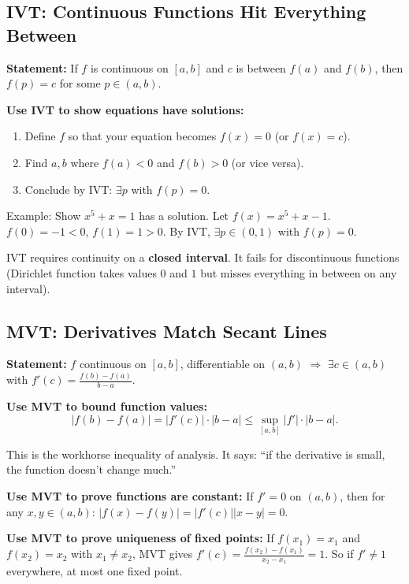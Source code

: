 \documentclass[11pt]{article}
\theoremstyle{definition}
\begin{document}
\subsection{IVT: Continuous Functions Hit Everything Between}

\textbf{Statement:} If $f$ is continuous on $[a,b]$ and $c$ is between $f(a)$ and $f(b)$, then $f(p) = c$ for some $p \in (a,b)$.

\begin{application}
\textbf{Use IVT to show equations have solutions:}
\begin{enumerate}
\item Define $f$ so that your equation becomes $f(x) = 0$ (or $f(x) = c$).
\item Find $a, b$ where $f(a) < 0$ and $f(b) > 0$ (or vice versa).
\item Conclude by IVT: $\exists p$ with $f(p) = 0$.
\end{enumerate}

Example: Show $x^5 + x = 1$ has a solution. Let $f(x) = x^5 + x - 1$. $f(0) = -1 < 0$, $f(1) = 1 > 0$. By IVT, $\exists p \in (0,1)$ with $f(p) = 0$.
\end{application}

\begin{pitfall}
IVT requires continuity on a \textbf{closed interval}. It fails for discontinuous functions (Dirichlet function takes values $0$ and $1$ but misses everything in between on any interval).
\end{pitfall}

\subsection{MVT: Derivatives Match Secant Lines}

\textbf{Statement:} $f$ continuous on $[a,b]$, differentiable on $(a,b)$ $\Rightarrow$ $\exists c \in (a,b)$ with $f'(c) = \frac{f(b) - f(a)}{b - a}$.

\begin{application}
\textbf{Use MVT to bound function values:}
$$|f(b) - f(a)| = |f'(c)| \cdot |b - a| \leq \sup_{[a,b]} |f'| \cdot |b - a|.$$

This is the workhorse inequality of analysis. It says: ``if the derivative is small, the function doesn't change much.''

\textbf{Use MVT to prove functions are constant:} If $f' = 0$ on $(a,b)$, then for any $x, y \in (a,b)$: $|f(x) - f(y)| = |f'(c)||x - y| = 0$.

\textbf{Use MVT to prove uniqueness of fixed points:} If $f(x_1) = x_1$ and $f(x_2) = x_2$ with $x_1 \neq x_2$, MVT gives $f'(c) = \frac{f(x_2) - f(x_1)}{x_2 - x_1} = 1$. So if $f' \neq 1$ everywhere, at most one fixed point.
\end{application}
\end{document}
